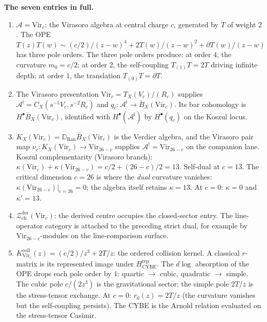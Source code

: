 \documentclass[11pt,reqno]{amsart}
\theoremstyle{definition}
\theoremstyle{remark}
\providecommand{\cA}{\mathcal{A}}
\providecommand{\cZ}{\mathcal{Z}}
\providecommand{\barB}{\bar{B}}
\providecommand{\Ran}{\mathrm{Ran}}
\providecommand{\Vir}{\mathrm{Vir}}
\providecommand{\der}{\mathrm{der}}
\providecommand{\ch}{\mathrm{ch}}
\numberwithin{equation}{section}
\begin{document}
\medskip\noindent\textbf{The seven entries in full.}\enspace
\begin{enumerate}[label=(\roman*),nosep]
\item $\cA = \Vir_c$: the Virasoro algebra at central charge $c$,
generated by $T$ of weight $2$. The OPE
$T(z)T(w) \sim (c/2)/(z-w)^4 + 2T(w)/(z-w)^2 + \partial T(w)/(z-w)$
has three pole orders. The three pole orders produce: at order $4$,
the curvature $m_0 = c/2$; at order $2$, the self-coupling
$T_{(1)}T = 2T$ driving infinite depth; at order $1$, the
translation $T_{(0)}T = \partial T$.

\item The Virasoro presentation
$\Vir_c=T_X(V_c)/(R_c)$ supplies
$\cA^{\mathrm i}=C_X(s^{-1}V_c,s^{-2}R_c)$ and
$q_c\colon\cA^{\mathrm i}\to\barB_X(\Vir_c)$.  Its bar cohomology is
$H^\bullet\barB_X(\Vir_c)$, identified with
$H^\bullet(\cA^{\mathrm i})$ by $H^\bullet(q_c)$ on the Koszul locus.

\item $K_X(\Vir_c)=\mathbb D_{\Ran}\barB_X(\Vir_c)$ is the Verdier
algebra, and the Virasoro pair map
$\nu_c\colon K_X(\Vir_c)\to\Vir_{26-c}$ supplies
$\cA^!=\Vir_{26-c}$ on the companion lane. Koszul
complementarity (Virasoro branch):
$\kappa(\Vir_c) + \kappa(\Vir_{26-c}) = c/2 + (26-c)/2 = 13$.
Self-dual at $c = 13$. The critical dimension $c = 26$ is where
the \emph{dual} curvature vanishes:
$\kappa(\Vir_{26-c})|_{c=26} = 0$; the algebra itself retains
$\kappa = 13$. At $c = 0$: $\kappa = 0$ and $\kappa' = 13$.

\item $\cZ^{\der}_{\ch}(\Vir_c)$: the derived centre occupies the
closed-sector entry. The line-operator category is attached to the
preceding strict dual, for example by $\Vir_{26-c}$-modules on the
line-comparison surface.

\item $K_{\Vir_c}^{\mathrm{coll}}(z)=(c/2)/z^3+2T/z$: the ordered
collision kernel. A classical $r$-matrix is its represented image
under $H_{\mathrm{CYBE}}^{\mathrm{rep}}$.
The $d\log$ absorption of the OPE drops each pole order by $1$:
quartic $\to$ cubic, quadratic $\to$ simple. The cubic pole
$c/(2z^3)$ is the gravitational sector; the simple pole $2T/z$ is
the stress-tensor exchange. At $c = 0$: $r_0(z) = 2T/z$ (the
curvature vanishes but the self-coupling persists). The CYBE
is the Arnold relation evaluated on the stress-tensor Casimir.


\end{enumerate}
\end{document}

